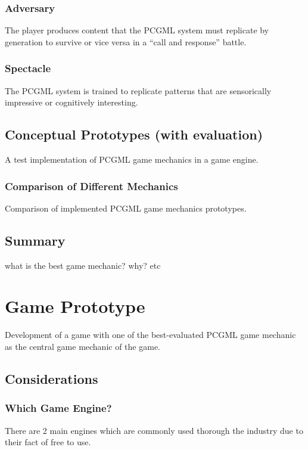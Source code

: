 \documentclass[MGS,Master,english]{twbook}%
\begin{document}
\subsection{Adversary}
The player produces content that the \ac{PCGML} system must replicate by generation to survive or vice versa in a “call and response” battle. \cite{pcgml::paper}

\subsection{Spectacle}
The \ac{PCGML} system is trained to replicate patterns that are sensorically impressive or cognitively interesting. \cite{pcgml::paper}

\section{Conceptual Prototypes (with evaluation)}
A test implementation of PCGML game mechanics in a game engine.

\subsection{Comparison of Different Mechanics}
Comparison of implemented PCGML game mechanics prototypes.

\section{Summary}
what is the best game mechanic? why? etc
%
%
\clearpage
\chapter{Game Prototype}
Development of a game with one of the best-evaluated PCGML game mechanic as the central game mechanic of the game.
\section{Considerations}

\subsection{Which Game Engine?}
There are 2 main engines which are commonly used thorough the industry due to their fact of free to use.
\end{document}
